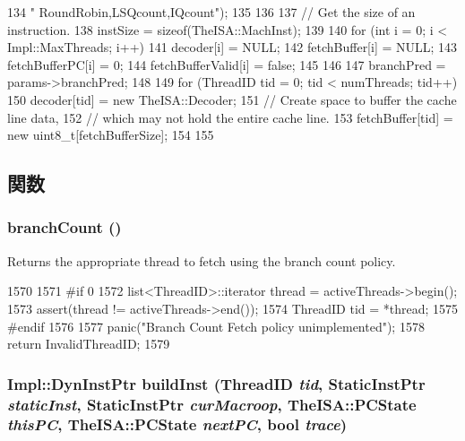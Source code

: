 \begin{DoxyCode}
{{{134               " RoundRobin,LSQcount,IQcount}\n");
135     }
136 
137     // Get the size of an instruction.
138     instSize = sizeof(TheISA::MachInst);
139 
140     for (int i = 0; i < Impl::MaxThreads; i++) {
141         decoder[i] = NULL;
142         fetchBuffer[i] = NULL;
143         fetchBufferPC[i] = 0;
144         fetchBufferValid[i] = false;
145     }
146 
147     branchPred = params->branchPred;
148 
149     for (ThreadID tid = 0; tid < numThreads; tid++) {
150         decoder[tid] = new TheISA::Decoder;
151         // Create space to buffer the cache line data,
152         // which may not hold the entire cache line.
153         fetchBuffer[tid] = new uint8_t[fetchBufferSize];
154     }
155 }
\end{DoxyCode}


\subsection{関数}
\hypertarget{classDefaultFetch_adbe8a1ec70863059cb0e121edc864a14}{
\subsubsection[{branchCount}]{ branchCount ()}}
\label{classDefaultFetch_adbe8a1ec70863059cb0e121edc864a14}
Returns the appropriate thread to fetch using the branch count policy. 


\begin{DoxyCode}
1570 {
1571 #if 0
1572     list<ThreadID>::iterator thread = activeThreads->begin();
1573     assert(thread != activeThreads->end());
1574     ThreadID tid = *thread;
1575 #endif
1576 
1577     panic("Branch Count Fetch policy unimplemented\n");
1578     return InvalidThreadID;
1579 }
\end{DoxyCode}
\hypertarget{classDefaultFetch_a9c38c3c5f6bb4a7c1919ca7d3d4e12dc}{
\subsubsection[{buildInst}]{\setlength{\rightskip}{0pt plus 5cm}Impl::DynInstPtr buildInst ({\bf ThreadID} {\em tid}, \/  {\bf StaticInstPtr} {\em staticInst}, \/  {\bf StaticInstPtr} {\em curMacroop}, \/  TheISA::PCState {\em thisPC}, \/  TheISA::PCState {\em nextPC}, \/  bool {\em trace})}}
\label{classDefaultFetch_a9c38c3c5f6bb4a7c1919ca7d3d4e12dc}



